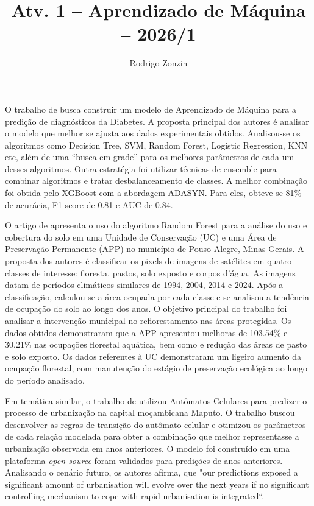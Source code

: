 \documentclass[]{article}
\title{Atv. 1 -- Aprendizado de Máquina -- 2026/1}
\author{Rodrigo Zonzin }
\begin{document}
\maketitle

O trabalho de \cite{KrivorotkoKabanikhin} busca construir um modelo de Aprendizado de Máquina para a predição de diagnósticos da Diabetes. A proposta principal dos autores é analisar o modelo que melhor se ajusta aos dados experimentais obtidos. Analisou-se os algoritmos como Decision Tree, SVM, Random Forest, Logistic Regression, KNN etc, além de uma ``busca em grade'' para os melhores parâmetros de cada um desses algoritmos. Outra estratégia foi utilizar técnicas de ensemble para combinar algoritmos e tratar desbalanceamento de classes. A melhor combinação foi  obtida pelo XGBoost com a abordagem ADASYN. Para eles, obteve-se 81\% de acurácia, F1-score de 0.81 e AUC de 0.84.

O artigo de \cite{meuartigo1} apresenta o uso do algoritmo Random Forest para a análise do uso e cobertura do solo em uma Unidade de Conservação (UC) e uma Área de Preservação Permanente  (APP) no município de Pouso Alegre, Minas Gerais. A proposta dos autores é classificar os pixels de imagens de satélites em quatro classes de interesse: floresta, pastos, solo exposto e corpos d'água. As imagens datam de períodos climáticos similares de 1994, 2004, 2014 e 2024. Após a classificação, calculou-se a área ocupada por cada classe e se analisou a tendência de ocupação do solo ao longo dos anos. O objetivo principal do trabalho foi analisar a intervenção municipal no reflorestamento nas áreas protegidas. Os dados obtidos demonstraram que a APP apresentou melhoras de 103.54\% e 30.21\% nas ocupações florestal aquática, bem como e redução das áreas de pasto e solo exposto. Os dados referentes à UC demonstraram um ligeiro aumento da ocupação florestal, com manutenção do estágio de preservação ecológica ao longo do período analisado.  

Em temática similar, o trabalho de \cite{JOKARARSANJANI201838} utilizou Autômatos Celulares para predizer o processo de urbanização na capital moçambicana Maputo. O trabalho buscou desenvolver as regras de transição do autômato celular e otimizou os parâmetros de cada relação modelada para obter a combinação que melhor representasse a urbanização observada em anos anteriores. O modelo foi construído em uma plataforma \textit{open source} foram validados para predições de anos anteriores. Analisando o cenário futuro, os autores afirma, que "our predictions exposed a significant amount of urbanisation will evolve over the next years if no significant controlling mechanism to cope with rapid urbanisation is integrated``.




\newpage



\end{document}

